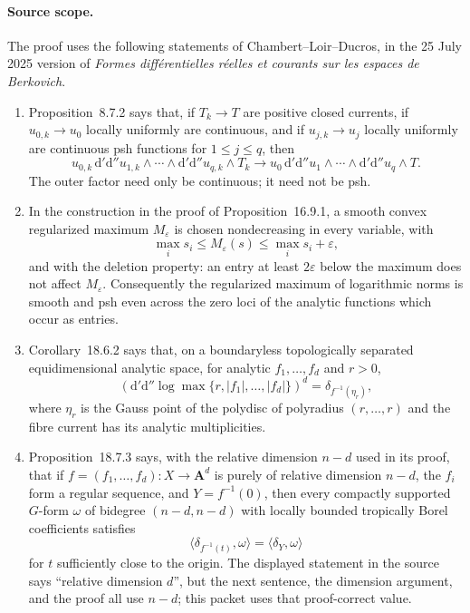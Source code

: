 
\paragraph{Source scope.}
The proof uses the following statements of Chambert--Loir--Ducros, in the
25 July 2025 version of \emph{Formes diff\'erentielles r\'eelles et courants
sur les espaces de Berkovich}.
\begin{enumerate}
\item Proposition~8.7.2 says that, if $T_k\to T$ are positive closed
currents, if $u_{0,k}\to u_0$ locally uniformly are continuous, and if
$u_{j,k}\to u_j$ locally uniformly are continuous psh functions for
$1\leq j\leq q$, then
\[
 u_{0,k}\,\mathrm d'\mathrm d''u_{1,k}\wedge\cdots\wedge
 \mathrm d'\mathrm d''u_{q,k}\wedge T_k
 \longrightarrow
 u_0\,\mathrm d'\mathrm d''u_1\wedge\cdots\wedge
 \mathrm d'\mathrm d''u_q\wedge T.
\]
The outer factor need only be continuous; it need not be psh.
\item In the construction in the proof of Proposition~16.9.1, a smooth
convex regularized maximum $M_\varepsilon$ is chosen nondecreasing in every
variable, with
\[
 \max_i s_i\leq M_\varepsilon(s)\leq\max_i s_i+\varepsilon,
\]
and with the deletion property: an entry at least $2\varepsilon$ below the
maximum does not affect $M_\varepsilon$.  Consequently the regularized
maximum of logarithmic norms is smooth and psh even across the zero loci of
the analytic functions which occur as entries.
\item Corollary~18.6.2 says that, on a boundaryless topologically separated
equidimensional analytic space, for analytic $f_1,\ldots,f_d$ and $r>0$,
\[
 \left(\mathrm d'\mathrm d''
  \log\max\{r,|f_1|,\ldots,|f_d|\}\right)^d
 =\delta_{f^{-1}(\eta_r)},
\]
where $\eta_r$ is the Gauss point of the polydisc of polyradius
$(r,\ldots,r)$ and the fibre current has its analytic multiplicities.
\item Proposition~18.7.3 says, with the relative dimension $n-d$ used in
its proof, that if $f=(f_1,\ldots,f_d):X\to\mathbf A^d$ is purely of
relative dimension $n-d$, the $f_i$ form a regular sequence, and
$Y=f^{-1}(0)$, then every compactly supported $G$-form $\omega$ of bidegree
$(n-d,n-d)$ with locally bounded tropically Borel coefficients satisfies
\[
 \langle\delta_{f^{-1}(t)},\omega\rangle
 =\langle\delta_Y,\omega\rangle
\]
for $t$ sufficiently close to the origin.  The displayed statement in the
source says ``relative dimension $d$'', but the next sentence, the
dimension argument, and the proof all use $n-d$; this packet uses that
proof-correct value.
\end{enumerate}

